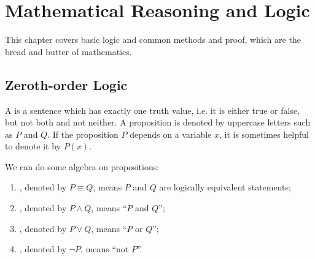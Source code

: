 \chapter{Mathematical Reasoning and Logic}\label{chap:logic-proofs}
This chapter covers basic logic and common methods and proof, which are the bread and butter of mathematics.

\section{Zeroth-order Logic}
A  is a sentence which has exactly one truth value, i.e. it is either true or false, but not both and not neither. A proposition is denoted by uppercase letters such as $P$ and $Q$. If the proposition $P$ depends on a variable $x$, it is sometimes helpful to denote it by $P(x)$. 

We can do some algebra on propositions:
\begin{enumerate}[label=(\roman*)]
\item {}, denoted by $P\equiv Q$, means $P$ and $Q$ are logically equivalent statements;

\item {}, denoted by $P\land Q$, means ``$P$ and $Q$'';

\item {}, denoted by $P\lor Q$, means ``$P$ or $Q$'';

\item {}, denoted by $\lnot P$, means ``not $P$''.
\end{enumerate}

